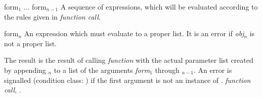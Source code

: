 \begin{optDefinition}
\begin{arguments}
    \item[form$_1$ ... form$_{n-1}$] A sequence of expressions, which will be
    evaluated according to the rules given in {\em function call}.

    \item[form$_n$] An expression which must evaluate to a proper list.  It is
    an error if {\em obj$_n$} is not a proper list.
\end{arguments}
%
\result%
The result is the result of calling {\em function} with the actual parameter
list created by appending $_n$ to a list of the arguments {\em
    form}$_1$ through $_{n-1}$.  An error is signalled (condition
class: ) if the
first argument is not an instance of .
%
\seealso%
{\em function call}, .
\end{optDefinition}

